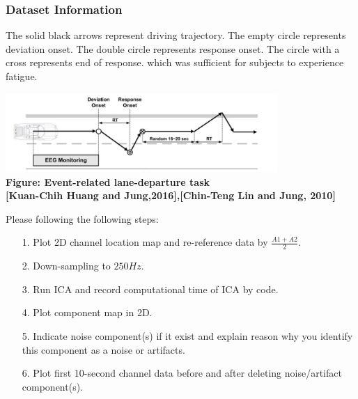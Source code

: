 \documentclass[a4 paper]{article}
\begin{document}
\subsubsection{Dataset Information}
The solid black arrows represent driving trajectory. The empty  circle represents deviation onset. The double circle represents response onset. The circle with a cross represents end of response. 
which was sufficient for subjects to experience fatigue.
\begin{center}
    \includegraphics[height=3cm]{figure/lane_keeping.JPG}\\
    \textbf{Figure: Event-related lane-departure task}\\
    \textbf{[Kuan-Chih Huang and Jung,2016],[Chin-Teng Lin and Jung, 2010]}
\end{center}
\begin{tcolorbox}[colback=RubineRed!5!white,colframe=RubineRed!75!black]
Please following the following steps:  
\begin{itemize}
    \item[1.] Plot 2D channel location map and re-reference data by $\frac{A1+A2}{2}$.
    \item[2.] Down-sampling to $250Hz$.
    \item[3.] Run ICA and record computational time of ICA by code.
    \item[4.] Plot component map in 2D.
    \item[5.] Indicate noise component(s) if it exist and explain reason why you identify this component as a noise or artifacts.
    \item[6.] Plot first 10-second channel data before and after deleting noise/artifact component(s). 
\end{itemize}
\end{tcolorbox}
\end{document}
